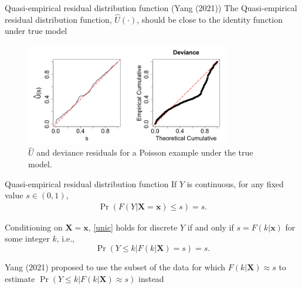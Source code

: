 \documentclass[
  ignorenonframetext,
]{beamer}
\begin{document}
\begin{frame}{Quasi-empirical residual distribution function (Yang
(2021))}
\protect\hypertarget{quasi-empirical-residual-distribution-function-yang2021assessment}{}
The Quasi-empirical residual distribution function, \(\hat{U}(\cdot)\),
should be close to the identity function under true model

\vspace{5pt}
    \begin{figure}[h]
        \includegraphics[width=0.8\textwidth]{figures/quickexample}
        \vspace{-0.1in}
        \caption{$\hat{U}$ and deviance residuals for  a Poisson example under the true model. }
    \end{figure}
\end{frame}

\begin{frame}{Quasi-empirical residual distribution function}
\protect\hypertarget{quasi-empirical-residual-distribution-function}{}
If \(Y\) is continuous, for any fixed value \(s \in (0, 1)\),
\begin{align}\label{unic}
    \Pr(F(Y|\mathbf{X}=\mathbf{x})\leq s)=s.
\end{align}

\vspace{12pt}

Conditioning on \(\mathbf{X}=\mathbf{x}\), \eqref{unic} holds for
discrete \(Y\) if and only if \(s=F(k| \mathbf{x})\) for some integer
\(k\), i.e., \[\Pr \left(Y\leq k| F(k| \mathbf{X})=s\right)=s.\]

\vspace{12pt}

Yang (2021) proposed to use the subset of the data for which
\(F(k| \mathbf{X})\approx s\) to estimate
\(\Pr(Y\leq k| F(k| \mathbf{X})\approx s)\) instead
\end{frame}
\end{document}
